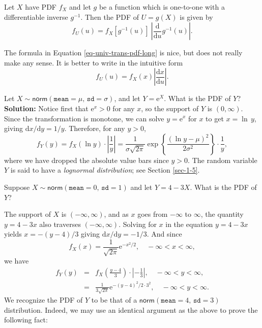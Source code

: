 \documentclass[captions=tableheading]{scrbook}
\begin{document}
\begin{prop}

Let \(X\) have PDF \(f_{X}\) and let \(g\) be a function which is one-to-one with a differentiable inverse \(g^{-1}\). Then the PDF of \(U=g(X)\) is given by
\begin{equation}
f_{U}(u)=f_{X}\left[g^{-1}(u)\right]\ \left|\frac{\mathrm{d}}{\mathrm{d} u}g^{-1}(u)\right|.\label{eq-univ-trans-pdf-long}
\end{equation}
\end{prop}

\begin{rem}
The formula in Equation \ref{eq-univ-trans-pdf-long} is nice, but does not really make any sense. It is better to write in the intuitive form
\begin{equation}
f_{U}(u)=f_{X}(x)\left|\frac{\mathrm{d} x}{\mathrm{d} u}\right|.\label{eq-univ-trans-pdf-short}
\end{equation}
\end{rem}

\begin{example}
Let \(X\sim\mathsf{norm}(\mathtt{mean}=\mu,\,\mathtt{sd}=\sigma)\), and let \(Y=\mathrm{e}^{X}\). What is the PDF of \(Y\)? 
\textbf{Solution:} Notice first that \(\mathrm{e}^{x}>0\) for any \(x\), so the support of \(Y\) is \((0,\infty)\). Since the transformation is monotone, we can solve \(y=\mathrm{e}^{x}\) for \(x\) to get \(x=\ln\, y\), giving \(\mathrm{d} x/\mathrm{d} y=1/y\). Therefore, for any \(y>0\),
\[
f_{Y}(y)=f_{X}(\ln y)\cdot\left|\frac{1}{y}\right|=\frac{1}{\sigma\sqrt{2\pi}}\exp\left\{ \frac{(\ln y-\mu)^{2}}{2\sigma^{2}}\right\} \cdot\frac{1}{y},
\]
where we have dropped the absolute value bars since \(y>0\). The random variable \(Y\) is said to have a \emph{lognormal distribution}; see Section \ref{sec-1-5}.
\end{example}

\begin{example}
Suppose \(X\sim\mathsf{norm}(\mathtt{mean}=0,\,\mathtt{sd}=1)\) and let \(Y=4-3X\). What is the PDF of \(Y\)?
\end{example}

The support of \(X\) is \((-\infty,\infty)\), and as \(x\) goes from \(-\infty\) to \(\infty\), the quantity \(y=4-3x\) also traverses \((-\infty,\infty)\). Solving for \(x\) in the equation \(y=4-3x\) yields \(x=-(y-4)/3\) giving \(\mathrm{d} x/\mathrm{d} y=-1/3\). And since
\[
f_{X}(x)=\frac{1}{\sqrt{2\pi}}\mathrm{e}^{-x^{2}/2}, \quad -\infty < x < \infty ,
\]
we have
\begin{eqnarray*}
f_{Y}(y) & = & f_{X}\left(\frac{y-4}{3}\right)\cdot\left|-\frac{1}{3}\right|,\quad-\infty<y<\infty,\\
 & = & \frac{1}{3\sqrt{2\pi}}\mathrm{e}^{-(y-4)^{2}/2\cdot3^{2}},\quad-\infty<y<\infty.
\end{eqnarray*}
We recognize the PDF of \(Y\) to be that of a \(\mathsf{norm}(\mathtt{mean}=4,\,\mathtt{sd}=3)\) distribution. Indeed, we may use an identical argument as the above to prove the following fact:
\end{document}
